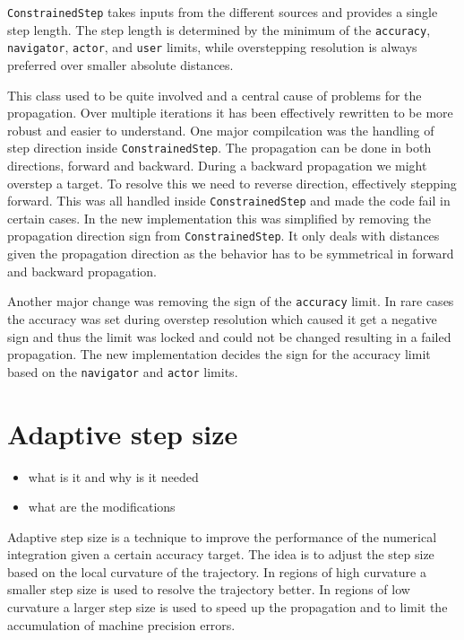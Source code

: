 \texttt{ConstrainedStep} takes inputs from the different sources and provides a single step length. The step length is determined by the minimum of the \texttt{accuracy}, \texttt{navigator}, \texttt{actor}, and \texttt{user} limits, while overstepping resolution is always preferred over smaller absolute distances.

This class used to be quite involved and a central cause of problems for the propagation. Over multiple iterations it has been effectively rewritten to be more robust and easier to understand. One major compilcation was the handling of step direction inside \texttt{ConstrainedStep}. The propagation can be done in both directions, forward and backward. During a backward propagation we might overstep a target. To resolve this we need to reverse direction, effectively stepping forward. This was all handled inside \texttt{ConstrainedStep} and made the code fail in certain cases. In the new implementation this was simplified by removing the propagation direction sign from \texttt{ConstrainedStep}. It only deals with distances given the propagation direction as the behavior has to be symmetrical in forward and backward propagation.

Another major change was removing the sign of the \texttt{accuracy} limit. In rare cases the accuracy was set during overstep resolution which caused it get a negative sign and thus the limit was locked and could not be changed resulting in a failed propagation. The new implementation decides the sign for the accuracy limit based on the \texttt{navigator} and \texttt{actor} limits.

\section{Adaptive step size}

\begin{itemize}
    \color{red}
    \item what is it and why is it needed
    \item what are the modifications
\end{itemize}

Adaptive step size is a technique to improve the performance of the numerical integration given a certain accuracy target. The idea is to adjust the step size based on the local curvature of the trajectory. In regions of high curvature a smaller step size is used to resolve the trajectory better. In regions of low curvature a larger step size is used to speed up the propagation and to limit the accumulation of machine precision errors.

